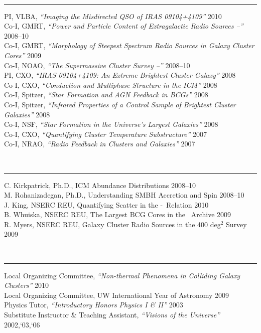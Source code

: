 \documentclass[12pt]{cv}
\begin{document}
{\large{}}\vspace{-0.3cm}\\
\rule{\linewidth}{0.5pt}
PI, VLBA, {\it{``Imaging the Misdirected QSO of IRAS 09104+4109''}} \hfill 2010\\
Co-I, GMRT, {\it{``Power and Particle Content of Extragalactic Radio Sources --''}} \hfill 2008--10\\
Co-I, GMRT, {\it{``Morphology of Steepest Spectrum Radio Sources in Galaxy Cluster Cores''}} \hfill 2009\\
Co-I, NOAO, {\it{``The Supermassive Cluster Survey --''}} \hfill 2008--10\\
PI, CXO, {\it{``IRAS 09104+4109: An Extreme Brightest Cluster Galaxy''}} \hfill 2008\\
Co-I, CXO, {\it``{Conduction and Multiphase Structure in the ICM''}} \hfill 2008\\
Co-I, Spitzer, {\it{``Star Formation and AGN Feedback in BCGs''}} \hfill 2008\\
Co-I, Spitzer, {\it{``Infrared Properties of a Control Sample of Brightest Cluster Galaxies''}} \hfill 2008\\
Co-I, NSF, {\it{``Star Formation in the Universe's Largest Galaxies''}} \hfill 2008\\
Co-I, CXO, {\it{``Quantifying Cluster Temperature Substructure''}} \hfill 2007\\
Co-I, NRAO, {\it{``Radio Feedback in Clusters and Galaxies''}} \hfill 2007

{\large{}}\vspace{-0.3cm}\\
\rule{\linewidth}{0.5pt}
C. Kirkpatrick, Ph.D., ICM Abundance Distributions \hfill 2008--10\\
M. Rohanizadegan, Ph.D., Understanding SMBH Accretion and Spin \hfill 2008--10\\
J. King, NSERC REU, Quantifying Scatter in the \pjet-\prad\ Relation \hfill 2010\\
B. Whuiska, NSERC REU, The Largest BCG Cores in the \hst\ Archive \hfill 2009\\
R. Myers, NSERC REU, Galaxy Cluster Radio Sources in the 400 deg$^2$ Survey \hfill 2009

{\large{}}\vspace{-0.3cm}\\
\rule{\linewidth}{0.5pt}
Local Organizing Committee, {\it{``Non-thermal Phenomena in Colliding Galaxy Clusters''}} \hfill 2010\\
Local Organizing Committee, UW International Year of Astronomy \hfill 2009\\
Physics Tutor, {\it{``Introductory Honors Physics I \& II''}} \hfill 2003\\
Substitute Instructor \& Teaching Assistant, {\it{``Visions of the Universe''}} \hfill 2002,`03,`06
\end{document}
